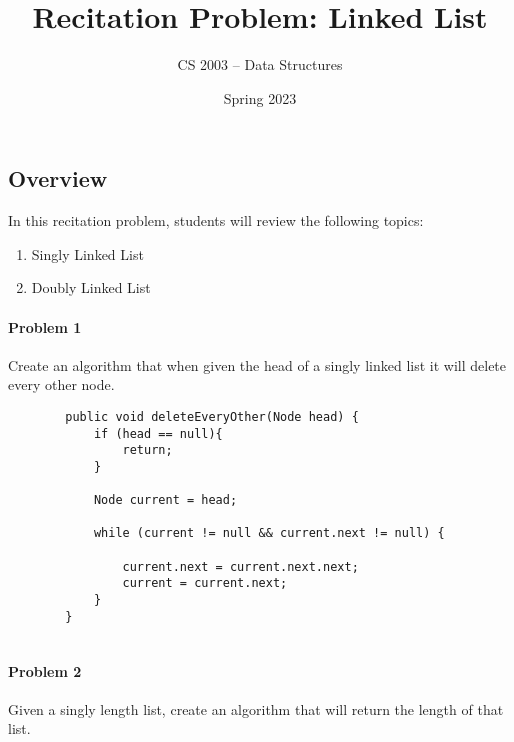 \documentclass[letterpaper]{article}
\title{Recitation Problem: Linked List}
\author{CS 2003 -- Data Structures}
\date{Spring 2023}
\begin{document}
	
	
	
	
	
	\maketitle
	
	
	
	
	\subsection*{Overview}
	
	In this recitation problem, students will review the following topics:
	
	\begin{enumerate}
		\item Singly Linked List
		\item Doubly Linked List
	\end{enumerate}
	
	\vspace{0.5em}
	
	\paragraph{Problem 1} Create an algorithm that when given the head of a singly linked list it will delete every other node. 
	
	\begin{verbatim}
        public void deleteEveryOther(Node head) {
            if (head == null){
                return;
            }
            
            Node current = head;
            
            while (current != null && current.next != null) {
            	
                current.next = current.next.next;
                current = current.next;
            }
        }
		
	\end{verbatim}
	
	\paragraph{Problem 2} Given a singly length list, create an algorithm that will return the length of that list.
	
\end{document}
